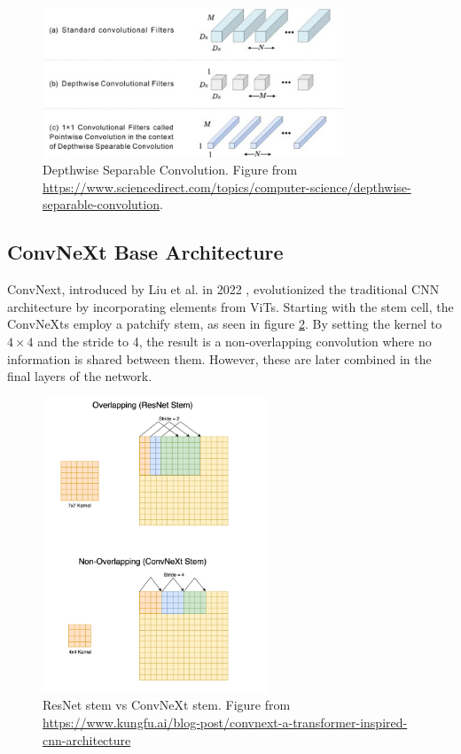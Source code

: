 \begin{figure}[ht]
    \centering
    \includegraphics[width=0.8\textwidth]{Images/depthwise_separable_conv.jpg} 
    \caption{Depthwise Separable Convolution. Figure from \url{https://www.sciencedirect.com/topics/computer-science/depthwise-separable-convolution}. }
    \label{fig:depthwise_sep_conv}
\end{figure}





\subsection{ConvNeXt Base Architecture}
\label{sec:convnext}
ConvNext, introduced by Liu et al. in 2022 \cite{liu2022convnet2020s}, evolutionized the traditional CNN architecture by incorporating elements from ViTs. Starting with the stem cell, the ConvNeXts employ a patchify stem, as seen in figure \ref{fig:stem}. By setting the kernel to $4 \times 4$ and the stride to 4, the result is a non-overlapping convolution where no information is shared between them. However, these are later combined in the final layers of the network.  

\begin{figure}[h!]
    \centering
    \includegraphics[width=0.6\textwidth]{Images/stem.png} 
    \caption{ResNet stem vs ConvNeXt stem. Figure from \url{https://www.kungfu.ai/blog-post/convnext-a-transformer-inspired-cnn-architecture} }
    \label{fig:stem}
\end{figure}


